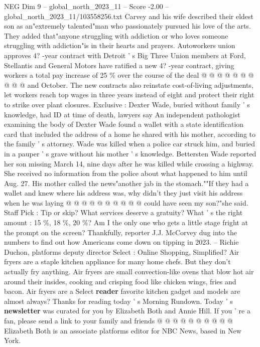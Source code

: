 \begin{textsample}{NEG Dim 9 – global\_north\_2023\_11 – Score -2.00 – global\_north\_2023\_11/103558256.txt}
Carvey and his wife described their eldest son as an"extremely talented"man who passionately pursued his love of the arts.
They added that"anyone struggling with addiction or who loves someone struggling with addiction"is in their hearts and prayers.
Autoworkers union approves 4? -year contract with Detroit ' s Big Three Union members at Ford, Stellantis and General Motors have ratified a new 4? -year contract, giving workers a total pay increase of 25 \% over the course of the deal @ @ @ @ @ @ @ @ @ @ and October.
The new contracts also reinstate cost-of-living adjustments, let workers reach top wages in three years instead of eight and protect their right to strike over plant closures.
Exclusive : Dexter Wade, buried without family ' s knowledge, had ID at time of death, lawyers say An independent pathologist examining the body of Dexter Wade found a wallet with a state identification card that included the address of a home he shared with his mother, according to the family ' s attorney.
Wade was killed when a police car struck him, and buried in a pauper ' s grave without his mother ' s knowledge.
Bettersten Wade reported her son missing March 14, nine days after he was killed while crossing a highway.
She received no information from the police about what happened to him until Aug. 27.
His mother called the news"another jab in the stomach.""If they had a wallet and knew where his address was, why didn't they just visit his address when he was laying @ @ @ @ @ @ @ @ @ @ could have seen my son?"she said.
Staff Pick : Tip or skip?
What services deserve a gratuity?
What ' s the right amount : 15 \%, 18 \%, 20 \%?
Am I the only one who gets a little stage fright at the prompt on the screen?
Thankfully, reporter J.J.
McCorvey dug into the numbers to find out how Americans come down on tipping in 2023. -- Richie Duchon, platforms deputy director Select : Online Shopping, Simplified?
Air fryers are a staple kitchen appliance for many home chefs.
But they don't actually fry anything.
Air fryers are small convection-like ovens that blow hot air around their insides, cooking and crisping food like chicken wings, fries and bacon.
Air fryers are a Select \textbf{reader} favorite kitchen gadget and models are almost always?
Thanks for reading today ' s Morning Rundown.
Today ' s \textbf{newsletter} was curated for you by Elizabeth Both and Annie Hill.
If you ' re a fan, please send a link to your family and friends @ @ @ @ @ @ @ @ @ @ Elizabeth Both is an associate platforms editor for NBC News, based in New York.

\end{textsample}
